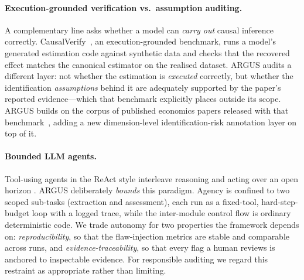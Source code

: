 \paragraph{Execution-grounded verification vs.\ assumption auditing.}
A complementary line asks whether a model can \emph{carry out} causal inference
correctly. CausalVerify~\cite{causalverify}, an execution-grounded benchmark,
runs a model's generated estimation code against synthetic data and checks that
the recovered effect matches the canonical estimator on the realised dataset.
ARGUS audits a different layer: not whether the estimation is \emph{executed}
correctly, but whether the identification \emph{assumptions} behind it are
adequately supported by the paper's reported evidence---which that benchmark
explicitly places outside its scope. ARGUS builds on the
corpus of published economics papers released with that
benchmark~\cite{causalverify_dataset}, adding a new dimension-level
identification-risk annotation layer on top of it.

\paragraph{Bounded LLM agents.}
Tool-using agents in the ReAct style interleave reasoning and acting over an open
horizon \cite{yao2023react}. ARGUS deliberately \emph{bounds} this paradigm.
Agency is confined to two scoped sub-tasks (extraction and assessment), each run
as a fixed-tool, hard-step-budget loop with a logged trace, while the
inter-module control flow is ordinary deterministic code. We trade autonomy for
two properties the framework depends on: \emph{reproducibility}, so that the
flaw-injection metrics are stable and comparable across runs, and
\emph{evidence-traceability}, so that every flag a human reviews is anchored to
inspectable evidence. For responsible auditing we regard this restraint as
appropriate rather than limiting.
